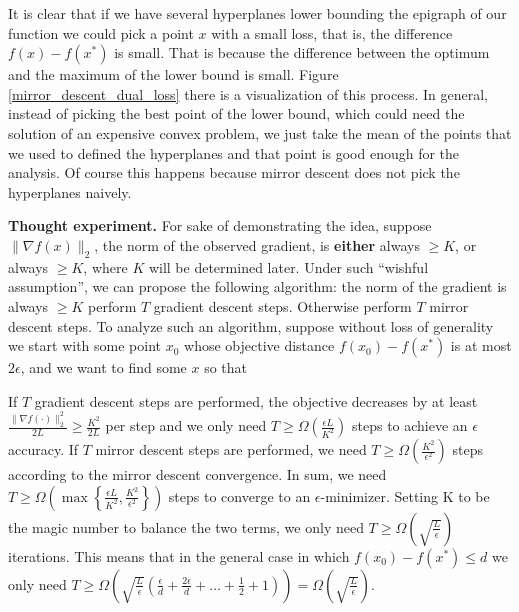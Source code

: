It is clear that if we have several hyperplanes lower bounding the epigraph of our function we could pick a point $x$ with a small loss, that is, the difference $f(x)-f(x^\ast)$ is small. That is because the difference between the optimum and the maximum of the lower bound is small. Figure \ref{mirror_descent_dual_loss} there is a visualization of this process. In general, instead of picking the best point of the lower bound, which could need the solution of an expensive convex problem, we just take the mean of the points that we used to defined the hyperplanes and that point is good enough for the analysis. Of course this happens because mirror descent does not pick the hyperplanes naively.


\textbf{Thought experiment.} For sake of demonstrating the idea, suppose $\| \nabla f(x) \|_2$, the norm of the observed gradient, is \textbf{either} always $\geq K$, or always $\geq K$, where $K$ will be determined later. Under such ``wishful assumption'', we can propose the following algorithm: the norm of the gradient is always $\geq K$ perform $T$ gradient descent steps. Otherwise perform $T$ mirror descent steps. To analyze such an algorithm, suppose without loss of generality we start with some point $x_0$ whose objective distance $f(x_0 )-f(x^\ast )$ is at most $2\epsilon$, and we want to find some $x$ so that

If $T$ gradient descent steps are performed, the objective decreases by at least $\frac{\|\nabla f(\cdot)\|_2^2}{2L} \geq \frac{K^2}{2L}$ per step and we only need $T \geq \Omega\left(\frac{\epsilon L}{K^2}\right)$ steps to achieve an $\epsilon$ accuracy. If $T$ mirror descent steps are performed, we need $T \geq \Omega\left(\frac{K^2}{\epsilon^2}\right)$ steps according to the mirror descent convergence. In sum, we need $T \geq \Omega\left( \max \left\{ \frac{\epsilon L}{K^2}, \frac{K^2}{\epsilon^2}\right\}\right)$ steps to converge to an $\epsilon$-minimizer. Setting K to be the magic number to balance the two terms, we only need $T \geq \Omega\left( \sqrt{\frac{L}{\epsilon}}\right)$ iterations. This means that in the general case in which $f(x_0) - f(x^\ast) \leq d $ we only need $T \geq \Omega \left(\sqrt{\frac{L}{\epsilon}}\left(\frac{\epsilon}{d} + \frac{2\epsilon}{d} + \dots + \frac{1}{2} + 1 \right)\right) = \Omega \left( \sqrt{\frac{L}{\epsilon}}\right)$.

